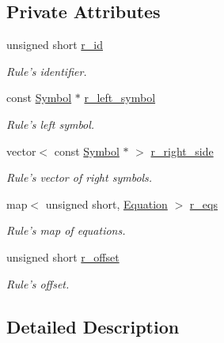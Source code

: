 \subsection*{Private Attributes}
\begin{CompactItemize}
\item 
unsigned short \hyperlink{classgenevalmag_1_1Rule_4dbfbae772914ba343251d7f027f48c6}{r\_\-id}
\begin{CompactList}\small\item\em Rule's identifier. \item\end{CompactList}\item 
const \hyperlink{classgenevalmag_1_1Symbol}{Symbol} $\ast$ \hyperlink{classgenevalmag_1_1Rule_7c56c879a7e4fdb2d35c79e061bfe862}{r\_\-left\_\-symbol}
\begin{CompactList}\small\item\em Rule's left symbol. \item\end{CompactList}\item 
vector$<$ const \hyperlink{classgenevalmag_1_1Symbol}{Symbol} $\ast$ $>$ \hyperlink{classgenevalmag_1_1Rule_54d3f67fb2b9adb926c9c82aa2d2353b}{r\_\-right\_\-side}
\begin{CompactList}\small\item\em Rule's vector of right symbols. \item\end{CompactList}\item 
map$<$ unsigned short, \hyperlink{classgenevalmag_1_1Equation}{Equation} $>$ \hyperlink{classgenevalmag_1_1Rule_acf0a4aeb6ca8e955490731de96902d2}{r\_\-eqs}
\begin{CompactList}\small\item\em Rule's map of equations. \item\end{CompactList}\item 
unsigned short \hyperlink{classgenevalmag_1_1Rule_7560aff8568cd1003d0a770729fa4873}{r\_\-offset}
\begin{CompactList}\small\item\em Rule's offset. \item\end{CompactList}\end{CompactItemize}


\subsection{Detailed Description}


